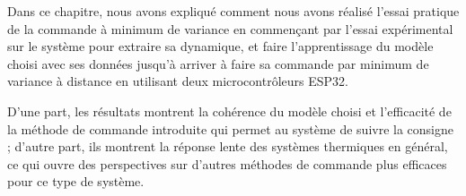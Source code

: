 Dans ce chapitre, nous avons expliqué comment nous avons réalisé l'essai pratique de la commande à minimum de variance en commençant par l'essai expérimental sur le système pour extraire sa dynamique, et faire l'apprentissage du modèle choisi avec ses données jusqu'à arriver à faire sa commande par minimum de variance à distance en utilisant deux microcontrôleurs ESP32.

D'une part, les résultats montrent la cohérence du modèle choisi et l'efficacité de la méthode de commande introduite qui permet au système de suivre la consigne ; d'autre part, ils montrent la réponse lente des systèmes thermiques en général, ce qui ouvre des perspectives sur d'autres méthodes de commande plus efficaces pour ce type de système.